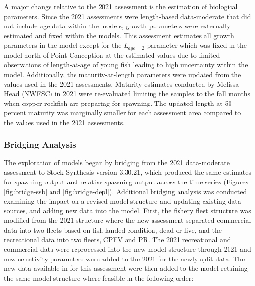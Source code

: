 \documentclass[11pt,
  english,
  letterpaper,
]{article}
\begin{document}
A major change relative to the 2021 assessment is the estimation of biological parameters. Since the 2021 assessments were length-based data-moderate that did not include age data within the models, growth parameters were externally estimated and fixed within the models. This assessment estimates all growth parameters in the model except for the \(L_{age=2}\) parameter which was fixed in the model north of Point Conception at the estimated values due to limited observations of length-at-age of young fish leading to high uncertainty within the model. Additionally, the maturity-at-length parameters were updated from the values used in the 2021 assessments. Maturity estimates conducted by Melissa Head (NWFSC) in 2021 were re-evaluated limiting the samples to the fall months when copper rockfish are preparing for spawning. The updated length-at-50-percent maturity was marginally smaller for each assessment area compared to the values used in the 2021 assessments.

\hypertarget{bridging-analysis}{%
\subsubsection{Bridging Analysis}\label{bridging-analysis}}

The exploration of models began by bridging from the 2021 data-moderate assessment to Stock Synthesis version 3.30.21, which produced the same estimates for spawning output and relative spawning output across the time series (Figures \ref{fig:bridge-ssb} and \ref{fig:bridge-depl}). Additional bridging analysis was conducted examining the impact on a revised model structure and updating existing data sources, and adding new data into the model. First, the fishery fleet structure was modified from the 2021 structure where the new assessment separated commercial data into two fleets based on fish landed condition, dead or live, and the recreational data into two fleets, CPFV and PR. The 2021 recreational and commercial data were reprocessed into the new model structure through 2021 and new selectivity parameters were added to the 2021 for the newly split data. The new data available in for this assessment were then added to the model retaining the same model structure where feasible in the following order:
\end{document}
